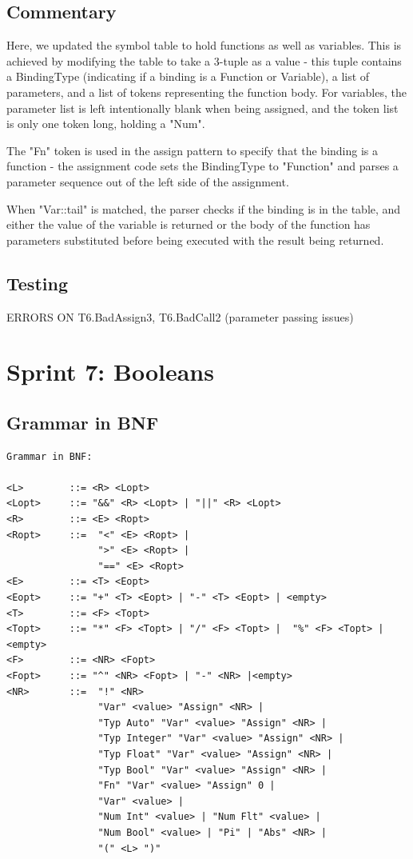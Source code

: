 \documentclass[a4paper, oneside, 11pt]{report}
\begin{document}
    \subsection{Commentary}
    Here, we updated the symbol table to hold functions as well as variables. This is achieved by modifying the table to take a 3-tuple as a value - this tuple contains a BindingType (indicating if a binding is a Function or Variable), a list of parameters, and a list of tokens representing the function body. For variables, the parameter list is left intentionally blank when being assigned, and the token list is only one token long, holding a "Num".

    The "Fn" token is used in the assign pattern to specify that the binding is a function - the assignment code sets the BindingType to "Function" and parses a parameter sequence out of the left side of the assignment.

    When "Var::tail" is matched, the parser checks if the binding is in the table, and either the value of the variable is returned or the body of the function has parameters substituted before being executed with the result being returned.

    \subsection{Testing}
    ERRORS ON T6.BadAssign3, T6.BadCall2 (parameter passing issues)


    \clearpage
    \section{Sprint 7: Booleans }
    \subsection{Grammar in BNF}
    \begin{verbatim}
Grammar in BNF:

<L>        ::= <R> <Lopt>
<Lopt>     ::= "&&" <R> <Lopt> | "||" <R> <Lopt>
<R>        ::= <E> <Ropt>
<Ropt>     ::=  "<" <E> <Ropt> |
                ">" <E> <Ropt> |
                "==" <E> <Ropt>
<E>        ::= <T> <Eopt>
<Eopt>     ::= "+" <T> <Eopt> | "-" <T> <Eopt> | <empty>
<T>        ::= <F> <Topt>
<Topt>     ::= "*" <F> <Topt> | "/" <F> <Topt> |  "%" <F> <Topt> |<empty>
<F>        ::= <NR> <Fopt>
<Fopt>     ::= "^" <NR> <Fopt> | "-" <NR> |<empty>
<NR>       ::=  "!" <NR>
                "Var" <value> "Assign" <NR> |
                "Typ Auto" "Var" <value> "Assign" <NR> |
                "Typ Integer" "Var" <value> "Assign" <NR> |
                "Typ Float" "Var" <value> "Assign" <NR> |
                "Typ Bool" "Var" <value> "Assign" <NR> |
                "Fn" "Var" <value> "Assign" 0 |
                "Var" <value> |
                "Num Int" <value> | "Num Flt" <value> |
                "Num Bool" <value> | "Pi" | "Abs" <NR> |
                "(" <L> ")"
    \end{verbatim}
\end{document}
